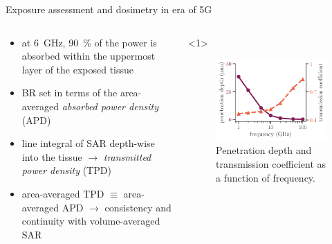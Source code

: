 \documentclass[xcolor=dvipsnames,10pt]{beamer}
\begin{document}
\begin{frame}{Exposure assessment and dosimetry in era of 5G}
    \begin{columns}[c]
        \begin{column}{0.5\textwidth}
             \begin{itemize}
                \item<1> at \SI{6}{\GHz}, \SI{90}{\percent} of the power is absorbed within the uppermost layer of the exposed tissue
                \item<2> BR set in terms of the area-averaged \emph{absorbed power density} (APD)
                \item<3> line integral of SAR depth-wise into the tissue $\rightarrow$ \emph{transmitted power density} (TPD)
                \item<4> area-averaged TPD $\equiv$ area-averaged APD $\rightarrow$ consistency and continuity with volume-averaged SAR
            \end{itemize}
        \end{column} 
        \begin{column}{0.5\textwidth}
            \begin{onlyenv}<1>
                \begin{center}
                \begin{figure}
                    \includegraphics[width=\textwidth]{figures/penetration_depth.pdf}
                    \caption{Penetration depth and transmission coefficient as a function of frequency.}
                \end{figure}
                \end{center}

\end{onlyenv}
\end{column}
\end{columns}
\end{frame}
\end{document}
